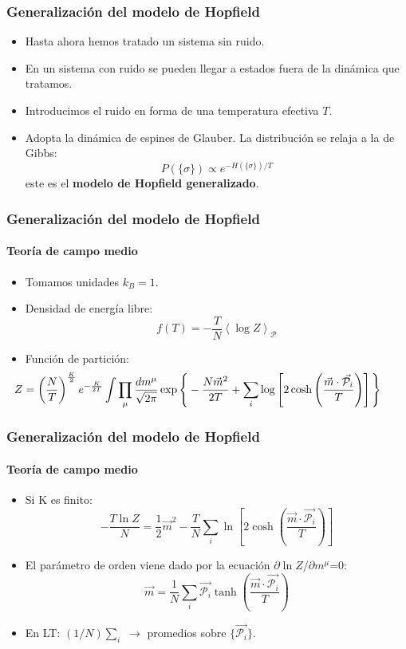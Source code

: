 \documentclass[11pt]{beamer}
\begin{document}
\begin{frame}
\frametitle{Generalización del modelo de Hopfield}
\begin{itemize}
	\item Hasta ahora hemos tratado un sistema sin ruido.
	\item En un sistema con ruido se pueden llegar a estados fuera de la dinámica que tratamos.
	\item Introducimos el ruido en forma de una temperatura efectiva $T$.
	\item Adopta la dinámica de espines de Glauber. La distribución se relaja a la de Gibbs:
	\begin{displaymath}
	P(\lbrace\sigma\rbrace)\propto e^{-H(\lbrace\sigma\rbrace)/T}
	\end{displaymath}
	este es el \textbf{modelo de Hopfield generalizado}.
\end{itemize}
\end{frame}

\begin{frame}
\frametitle{Generalización del modelo de Hopfield}
\framesubtitle{Teoría de campo medio}
\begin{itemize}
	\item Tomamos unidades $k_B=1$.
	\item Densidad de energía libre:
	\begin{displaymath}
	f(T)=-\frac{T}{N}\left<\log Z\right>_{\mathcal{P}}
	\end{displaymath}
	\item Función de partición:
	\begin{displaymath}
	\hspace{-1.225cm}Z=\left(\frac{N}{T}\right)^{\frac{K}{2}}e^{-\frac{K}{2T}}\int\prod_\mu \frac{dm^\mu}{\sqrt{2\pi}}\exp\Bigg\{-\frac{N\vec{m}^2}{2T}+\sum_i \log\left[2\cosh\left(\frac{\vec{m}\cdot\vec{\mathcal{P}_i}}{T}\right)\right]\Bigg\}
	\end{displaymath}
\end{itemize}
\end{frame}

\begin{frame}
\frametitle{Generalización del modelo de Hopfield}
\framesubtitle{Teoría de campo medio}
\begin{itemize}
	\item Si K es finito:
	\begin{displaymath}
	-\frac{T\ln Z}{N}=\frac{1}{2}\vec{m}^2-\frac{T}{N}\sum_i\ln\left[2\cosh\left(\frac{\vec{m}\cdot\vec{\mathcal{P}_i}}{T}\right)\right]
	\end{displaymath}
	\item El parámetro de orden viene dado por la ecuación $\partial\ln Z/\partial m^\mu$=0:
	\begin{displaymath}
	\vec{m}=\frac{1}{N}\sum_i \vec{\mathcal{P}_i}\tanh\left(\frac{\vec{m}\cdot\vec{\mathcal{P}_i}}{T}\right)
	\end{displaymath}
	\item En LT: $(1/N)\sum_i$ $\rightarrow$ promedios sobre $\lbrace\vec{\mathcal{P}_i}\rbrace$.
\end{itemize}
\end{frame}
\end{document}

